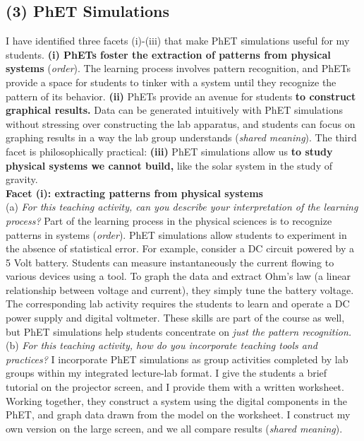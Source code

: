 \documentclass[../../../main.tex]{subfiles}
\begin{document}
\subsection{(3) PhET Simulations}

I have identified three facets (i)-(iii) that make PhET simulations useful for my students. \textbf{(i) PhETs foster the extraction of patterns from physical systems} (\textit{order}).  The learning process involves pattern recognition, and PhETs provide a space for students to tinker with a system until they recognize the pattern of its behavior. \textbf{(ii)} PhETs provide an avenue for students \textbf{to construct graphical results.} Data can be generated intuitively with PhET simulations without stressing over constructing the lab apparatus, and students can focus on graphing results in a way the lab group understands (\textit{shared meaning}).  The third facet is philosophically practical: \textbf{(iii)} PhET simulations allow us \textbf{to study physical systems we cannot build,} like the solar system in the study of gravity.
\\
\vspace{0.25cm}
\textbf{Facet (i): extracting patterns from physical systems}
\\
\vspace{0.25cm}
(a) \textit{For this teaching activity, can you describe your interpretation of the learning process?} Part of the learning process in the physical sciences is to recognize patterns in systems (\textit{order}).  PhET simulations allow students to experiment in the absence of statistical error.  For example, consider a DC circuit powered by a 5 Volt battery.  Students can measure instantaneously the current flowing to various devices using a tool.  To graph the data and extract Ohm's law (a linear relationship between voltage and current), they simply tune the battery voltage.  The corresponding lab activity requires the students to learn and operate a DC power supply and digital voltmeter.  These skills are part of the course as well, but PhET simulations help students concentrate on \textit{just the pattern recognition.}
\\
\vspace{0.25cm}
(b) \textit{For this teaching activity, how do you incorporate teaching tools and practices?}  I incorporate PhET simulations as group activities completed by lab groups within my integrated lecture-lab format.  I give the students a brief tutorial on the projector screen, and I provide them with a written worksheet.  Working together, they construct a system using the digital components in the PhET, and graph data drawn from the model on the worksheet.  I construct my own version on the large screen, and we all compare results (\textit{shared meaning}).
\end{document}
